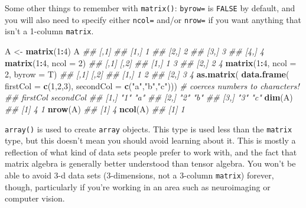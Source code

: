 \documentclass[12pt,krantz2]{krantz}
\makeatletter
\newenvironment{Shaded}{\begin{snugshade}}{\end{snugshade}}
\newcommand{\CommentTok}[1]{\textcolor[rgb]{0.37,0.37,0.37}{\textit{#1}}}
\newcommand{\DataTypeTok}[1]{\textcolor[rgb]{0.27,0.27,0.27}{#1}}
\newcommand{\DecValTok}[1]{\textcolor[rgb]{0.06,0.06,0.06}{#1}}
\newcommand{\KeywordTok}[1]{\textcolor[rgb]{0.27,0.27,0.27}{\textbf{#1}}}
\newcommand{\NormalTok}[1]{#1}
\newcommand{\OperatorTok}[1]{\textcolor[rgb]{0.43,0.43,0.43}{\textbf{#1}}}
\newcommand{\StringTok}[1]{\textcolor[rgb]{0.5,0.5,0.5}{#1}}
\newenvironment{kframe}{%
\medskip{}
\setlength{\fboxsep}{.8em}
 \def\at@end@of@kframe{}%
 \ifinner\ifhmode%
  \def\at@end@of@kframe{\end{minipage}}%
  \begin{minipage}{\columnwidth}%
 \fi\fi%
 \def\FrameCommand##1{\hskip\@totalleftmargin \hskip-\fboxsep
 \colorbox{shadecolor}{##1}\hskip-\fboxsep
     \hskip-\linewidth \hskip-\@totalleftmargin \hskip\columnwidth}%
 \MakeFramed {\advance\hsize-\width
   \@totalleftmargin\z@ \linewidth\hsize
   \@setminipage}}%
 {\par\unskip\endMakeFramed%
 \at@end@of@kframe}
\renewenvironment{Shaded}{\begin{kframe}}{\end{kframe}}
\makeatother
\begin{document}
Some other things to remember with \texttt{matrix()}: \texttt{byrow=} is \texttt{FALSE} by default, and you will also need to specify either \texttt{ncol=} and/or \texttt{nrow=} if you want anything that isn't a 1-column \texttt{matrix}.

\begin{Shaded}
\begin{Highlighting}[]
\NormalTok{A <-}\StringTok{ }\KeywordTok{matrix}\NormalTok{(}\DecValTok{1}\OperatorTok{:}\DecValTok{4}\NormalTok{)}
\NormalTok{A}
\CommentTok{##      [,1]}
\CommentTok{## [1,]    1}
\CommentTok{## [2,]    2}
\CommentTok{## [3,]    3}
\CommentTok{## [4,]    4}
\KeywordTok{matrix}\NormalTok{(}\DecValTok{1}\OperatorTok{:}\DecValTok{4}\NormalTok{, }\DataTypeTok{ncol =} \DecValTok{2}\NormalTok{)}
\CommentTok{##      [,1] [,2]}
\CommentTok{## [1,]    1    3}
\CommentTok{## [2,]    2    4}
\KeywordTok{matrix}\NormalTok{(}\DecValTok{1}\OperatorTok{:}\DecValTok{4}\NormalTok{, }\DataTypeTok{ncol =} \DecValTok{2}\NormalTok{, }\DataTypeTok{byrow =}\NormalTok{ T)}
\CommentTok{##      [,1] [,2]}
\CommentTok{## [1,]    1    2}
\CommentTok{## [2,]    3    4}
\KeywordTok{as.matrix}\NormalTok{(}
  \KeywordTok{data.frame}\NormalTok{(}
    \DataTypeTok{firstCol =} \KeywordTok{c}\NormalTok{(}\DecValTok{1}\NormalTok{,}\DecValTok{2}\NormalTok{,}\DecValTok{3}\NormalTok{),}
    \DataTypeTok{secondCol =} \KeywordTok{c}\NormalTok{(}\StringTok{"a"}\NormalTok{,}\StringTok{"b"}\NormalTok{,}\StringTok{"c"}\NormalTok{))) }\CommentTok{# coerces numbers to characters!}
\CommentTok{##      firstCol secondCol}
\CommentTok{## [1,] "1"      "a"      }
\CommentTok{## [2,] "2"      "b"      }
\CommentTok{## [3,] "3"      "c"}
\KeywordTok{dim}\NormalTok{(A)}
\CommentTok{## [1] 4 1}
\KeywordTok{nrow}\NormalTok{(A)}
\CommentTok{## [1] 4}
\KeywordTok{ncol}\NormalTok{(A)}
\CommentTok{## [1] 1}
\end{Highlighting}
\end{Shaded}

\texttt{array()} is used to create \texttt{array} objects. This type is used less than the \texttt{matrix} type, but this doesn't mean you should avoid learning about it. This is mostly a reflection of what kind of data sets people prefer to work with, and the fact that matrix algebra is generally better understood than tensor algebra. You won't be able to avoid 3-d data sets (3-dimensions, not a 3-column \texttt{matrix}) forever, though, particularly if you're working in an area such as neuroimaging or computer vision.
\end{document}
